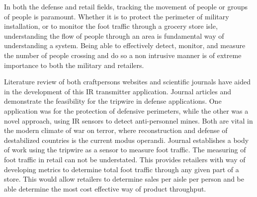 



In both the defense and retail fields, tracking the movement of people or groups of people is paramount. Whether it is to protect the perimeter of military installation, or to monitor the foot traffic through a grocery store isle, understanding the flow of people through an area is fundamental way of understanding a system. Being able to effectively detect, monitor, and measure the number of people crossing and do so a non intrusive manner is of extreme importance to both the military and retailers.

Literature review of both craftpersons websites and scientific journals have aided in the development of this IR transmitter application. Journal articles \cite{b1} and \cite{b2} demonstrate the feasibility for the tripwire in defense applications. One application was for the protection of defensive perimeters, while the other was a novel approach, using IR sensors to detect anti-personnel mines. Both are vital in the modern climate of war on terror, where reconstruction and defense of destabilized countries is the current modus operandi. Journal \cite{b3} establishes a body of work using the tripwire as a sensor to measure foot traffic. The measuring of foot traffic in retail can not be understated. This provides retailers with way of developing metrics to determine total foot traffic through any given part of a store. This would allow retailers to determine sales per aisle per person and be able determine the most cost effective way of product throughput.
	






